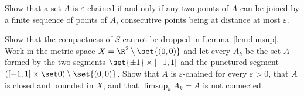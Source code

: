 \begin{exercise}
Show that a set $A$ is $\varepsilon$-chained if and only if any two points of $A$ can be
joined by a finite sequence of points of $A$, consecutive points being at distance at most
$\varepsilon$.
\end{exercise}

\begin{exercise}
Show that the compactness of $S$ cannot be dropped in Lemma~\ref{lem:limsup}. Work in the
metric space $X=\R^2\setminus\set{(0,0)}$ and let every $A_k$ be the set $A$ formed by the two
segments $\set{\pm1}\times[-1,1]$ and the punctured segment $([-1,1]\times\set0)\setminus
\set{(0,0)}$. Show that $A$ is $\varepsilon$-chained for every $\varepsilon>0$, that $A$ is
closed and bounded in $X$, and that $\limsup_kA_k=A$ is not connected.
\end{exercise}
